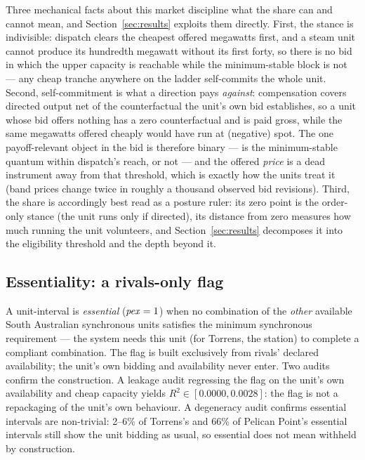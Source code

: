 Three mechanical facts about this market discipline what the share can and
cannot mean, and Section~\ref{sec:results} exploits them directly. First,
the stance is indivisible: dispatch clears the cheapest offered megawatts
first, and a steam unit cannot produce its hundredth megawatt without its
first forty, so there is no bid in which the upper capacity is reachable
while the minimum-stable block is not --- any cheap tranche anywhere on the
ladder self-commits the whole unit. Second, self-commitment is what a
direction pays \emph{against}: compensation covers directed output net of
the counterfactual the unit's own bid establishes, so a unit whose bid
offers nothing has a zero counterfactual and is paid gross, while the same
megawatts offered cheaply would have run at (negative) spot. The one
payoff-relevant object in the bid is therefore binary --- is the
minimum-stable quantum within dispatch's reach, or not --- and the offered
\emph{price} is a dead instrument away from that threshold, which is
exactly how the units treat it (band prices change twice in roughly a
thousand observed bid revisions). Third, the share is accordingly best read
as a posture ruler: its zero point is the order-only stance (the unit runs
only if directed), its distance from zero measures how much running the
unit volunteers, and Section~\ref{sec:results} decomposes it into the
eligibility threshold and the depth beyond it.

\subsection{Essentiality: a rivals-only flag}

A unit-interval is \emph{essential} ($\mathit{pex}=1$) when no combination of the
\emph{other} available South Australian synchronous units satisfies the minimum
synchronous requirement --- the system needs this unit (for Torrens, the
station) to complete a compliant combination. The flag is built exclusively
from rivals' declared availability; the unit's own bidding and availability
never enter. Two audits confirm the construction. A leakage audit regressing
the flag on the unit's own availability and cheap capacity yields
$R^{2}\in[0.0000, 0.0028]$: the flag is not a repackaging of the unit's own
behaviour. A degeneracy audit confirms essential intervals are non-trivial:
2--6\% of Torrens's and 66\% of Pelican Point's essential intervals still show
the unit bidding as usual, so essential does not mean withheld by
construction.

